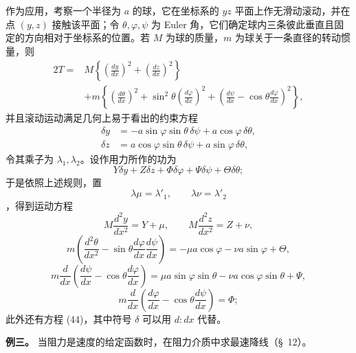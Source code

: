 \documentclass[11pt,a4paper,leqno]{article}
\begin{document}
作为应用，考察一个半径为 $a$ 的球，它在坐标系的 $yz$ 平面上作无滑动滚动，并在点 $(y,z)$ 接触该平面；令 $\theta,\varphi,\psi$ 为 Euler 角，它们确定球内三条彼此垂直且固定的方向相对于坐标系的位置。若 $M$ 为球的质量，$m$ 为球关于一条直径的转动惯量，则
\[
\begin{aligned}
2T={}&M\left\{\left(\frac{dy}{dx}\right)^2+\left(\frac{dz}{dx}\right)^2\right\}\\
&+m\left\{\left(\frac{d\theta}{dx}\right)^2
+\sin^2\theta\left(\frac{d\varphi}{dx}\right)^2
+\left(\frac{d\psi}{dx}-\cos\theta\frac{d\varphi}{dx}\right)^2\right\},
\end{aligned}
\]
并且滚动运动满足几何上易于看出的约束方程
\begin{equation}\tag{44}
\begin{aligned}
\delta y&=-a\sin\varphi\sin\theta\,\delta\psi+a\cos\varphi\,\delta\theta,\\
\delta z&= a\cos\varphi\sin\theta\,\delta\psi+a\sin\varphi\,\delta\theta,
\end{aligned}
\end{equation}
令其乘子为 $\lambda_1,\lambda_2$。设作用力所作的功为
\[
Y\delta y+Z\delta z+\Phi\delta\varphi+\Psi\delta\psi+\Theta\delta\theta;
\]
于是依照上述规则，置
\[
\lambda\mu=\lambda'_1,\qquad \lambda\nu=\lambda'_2
\]
，得到运动方程
\[
M\frac{d^2y}{dx^2}=Y+\mu,\qquad
M\frac{d^2z}{dx^2}=Z+\nu,
\]
\[
m\left(\frac{d^2\theta}{dx^2}-\sin\theta\frac{d\varphi}{dx}\frac{d\psi}{dx}\right)
=-\mu a\cos\varphi-\nu a\sin\varphi+\Theta,
\]
\[
m\frac{d}{dx}\left(\frac{d\psi}{dx}-\cos\theta\frac{d\varphi}{dx}\right)
=\mu a\sin\varphi\sin\theta-\nu a\cos\varphi\sin\theta+\Psi,
\]
\[
m\frac{d}{dx}\left(\frac{d\varphi}{dx}-\cos\theta\frac{d\psi}{dx}\right)=\Phi;
\]
此外还有方程 (44)，其中符号 $\delta$ 可以用 $d:dx$ 代替。

\noindent\textbf{例三。} 当阻力是速度的给定函数时，在阻力介质中求最速降线（\S~12）。
\end{document}
